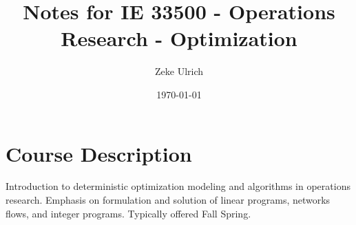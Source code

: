 \documentclass[nobib]{tufte-handout}
\title{Notes for IE 33500 - Operations Research - Optimization }
\author{Zeke Ulrich}
\date{\today}
\begin{document}
\maketitle

\tableofcontents

\section{Course Description}
Introduction to deterministic optimization modeling and algorithms in operations research. Emphasis on formulation and solution of linear programs, networks flows, and integer programs. Typically offered Fall Spring.


\pagebreak




\end{document}
